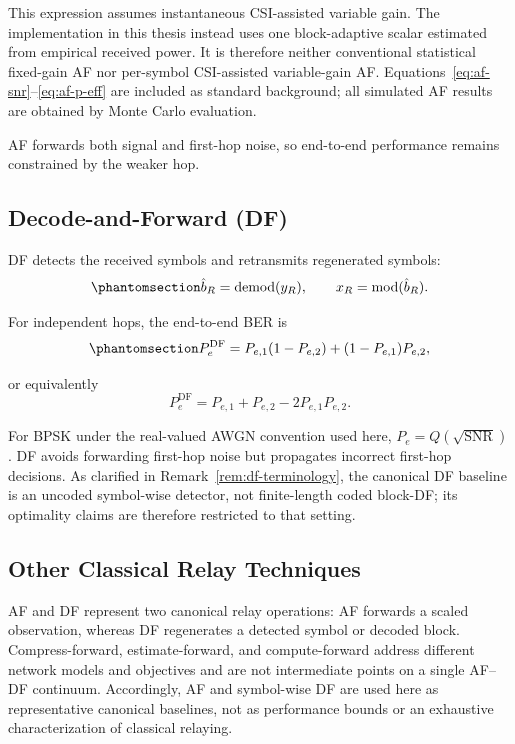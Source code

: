 This expression assumes instantaneous CSI-assisted variable gain. The implementation in this thesis instead uses one block-adaptive scalar estimated from empirical received power. It is therefore neither conventional statistical fixed-gain AF nor per-symbol CSI-assisted variable-gain AF. Equations~\ref{eq:af-snr}--\ref{eq:af-p-eff} are included as standard background; all simulated AF results are obtained by Monte Carlo evaluation.

AF forwards both signal and first-hop noise, so end-to-end performance remains constrained by the weaker hop.

\subsection{Decode-and-Forward (DF)}\label{sec:classical-relay-strategies-df}

DF detects the received symbols and retransmits regenerated symbols:
\begin{equation}\protect\phantomsection\label{eq:df-demod-remod}
\hat{b}_R=\text{demod}(y_R),
\qquad
x_R=\text{mod}(\hat{b}_R).
\end{equation}

For independent hops, the end-to-end BER is
\begin{equation}\protect\phantomsection\label{eq:df-ber-hops}
P_e^{\text{DF}}
=
P_{e,1}(1-P_{e,2})
+
(1-P_{e,1})P_{e,2},
\end{equation}
or equivalently
\[
P_e^{\text{DF}}
=
P_{e,1}+P_{e,2}-2P_{e,1}P_{e,2}.
\]

For BPSK under the real-valued AWGN convention used here,
\(P_e=Q(\sqrt{\text{SNR}})\). DF avoids forwarding first-hop noise but propagates incorrect first-hop decisions. As clarified in Remark~\ref{rem:df-terminology}, the canonical DF baseline is an uncoded symbol-wise detector, not finite-length coded block-DF; its optimality claims are therefore restricted to that setting.

\subsection{Other Classical Relay Techniques}

AF and DF represent two canonical relay operations: AF forwards a scaled observation, whereas DF regenerates a detected symbol or decoded block. Compress-forward, estimate-forward, and compute-forward address different network models and objectives and are not intermediate points on a single AF--DF continuum. Accordingly, AF and symbol-wise DF are used here as representative canonical baselines, not as performance bounds or an exhaustive characterization of classical relaying.

